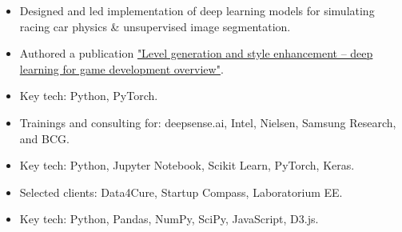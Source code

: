 \documentclass[10pt,a4paper,ragged2e,withhyper]{altacv}
\begin{document}
\begin{paracol}{2}
\begin{itemize}
\item Designed and led implementation of deep learning models for simulating racing car physics \& unsupervised image segmentation.
\item Authored a publication \href{https://arxiv.org/abs/2107.07397}{"Level generation and style enhancement -- deep learning for game development overview"}.
\item Key tech: Python, PyTorch.
\end{itemize}

\divider

\begin{itemize}
\item Trainings and consulting for: deepsense.ai, Intel, Nielsen, Samsung Research, and BCG.
\item Key tech: Python, Jupyter Notebook, Scikit Learn, PyTorch, Keras.
\end{itemize}

\divider

\begin{itemize}
\item Selected clients: Data4Cure, Startup Compass, Laboratorium EE.
\item Key tech: Python, Pandas, NumPy, SciPy, JavaScript, D3.js.
\end{itemize}





\end{paracol}
\end{document}
